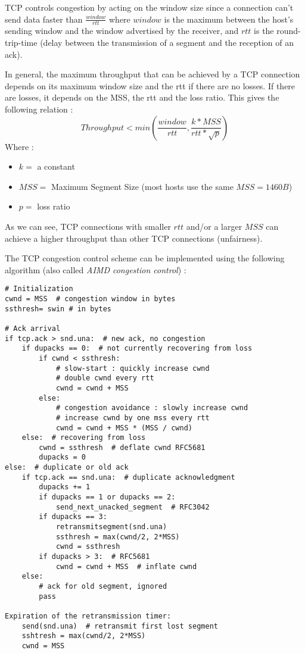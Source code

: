 TCP controls congestion by acting on the window size since a connection can't send data faster than $\frac{window}{rtt}$ where $window$ is the maximum between the host's sending window and the window advertised by the receiver, and $rtt$ is the round-trip-time (delay between the transmission of a segment and the reception of an ack).

In general, the maximum throughput that can be achieved by a TCP connection depends on its maximum window size and the rtt if there are no losses. If there are losses, it depends on the MSS, the rtt and the loss ratio. This gives the following relation :
\begin{equation*}
Throughput < min(\frac{window}{rtt}, \frac{k * MSS}{rtt * \sqrt{p}})
\end{equation*}
Where :
\begin{itemize}
\item $k =$ a constant
\item $MSS =$ Maximum Segment Size (most hosts use the same $MSS = 1460B$)
\item $p =$ loss ratio
\end{itemize}

As we can see, TCP connections with smaller $rtt$ and/or a larger $MSS$ can achieve a higher throughput than other TCP connections (unfairness).

\newpage
The TCP congestion control scheme can be implemented using the following algorithm (also called \textit{AIMD congestion control}) :
\begin{verbatim}
# Initialization
cwnd = MSS  # congestion window in bytes
ssthresh= swin # in bytes

# Ack arrival
if tcp.ack > snd.una:  # new ack, no congestion
    if dupacks == 0:  # not currently recovering from loss
        if cwnd < ssthresh:
            # slow-start : quickly increase cwnd
            # double cwnd every rtt
            cwnd = cwnd + MSS
        else:
            # congestion avoidance : slowly increase cwnd
            # increase cwnd by one mss every rtt
            cwnd = cwnd + MSS * (MSS / cwnd)
    else:  # recovering from loss
        cwnd = ssthresh  # deflate cwnd RFC5681
        dupacks = 0
else:  # duplicate or old ack
    if tcp.ack == snd.una:  # duplicate acknowledgment
        dupacks += 1
        if dupacks == 1 or dupacks == 2:
            send_next_unacked_segment  # RFC3042
        if dupacks == 3:
            retransmitsegment(snd.una)
            ssthresh = max(cwnd/2, 2*MSS)
            cwnd = ssthresh
        if dupacks > 3:  # RFC5681
            cwnd = cwnd + MSS  # inflate cwnd
    else:
        # ack for old segment, ignored
        pass

Expiration of the retransmission timer:
    send(snd.una)  # retransmit first lost segment
    sshtresh = max(cwnd/2, 2*MSS)
    cwnd = MSS
\end{verbatim}

